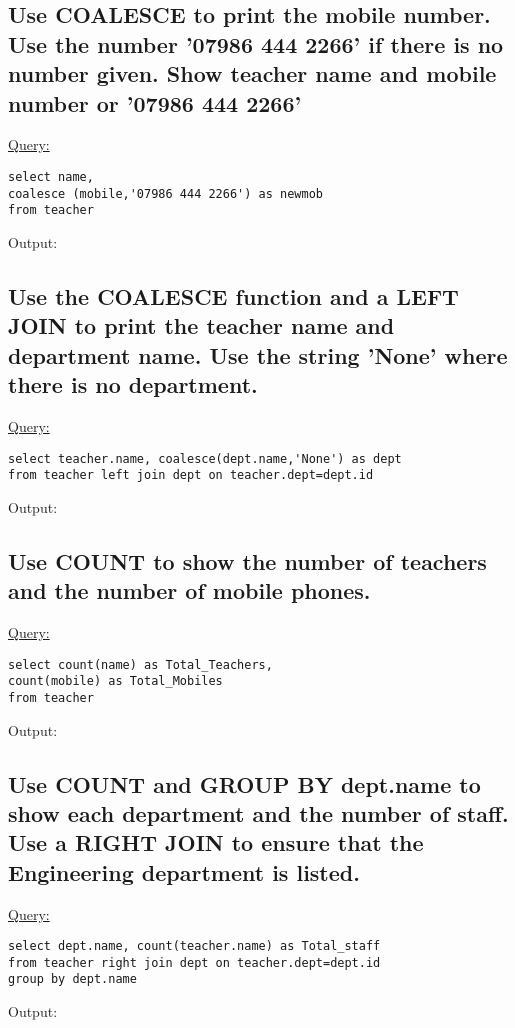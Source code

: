 \documentclass[a4paper,11pt]{article}
\begin{document}
\subsection{Use COALESCE to print the mobile number. Use the number '07986 444 2266' if there is no number given. Show teacher name and mobile number or '07986 444 2266'}
\underline{Query:}
\begin{lstlisting}[showstringspaces=false]
select name,
coalesce (mobile,'07986 444 2266') as newmob
from teacher
\end{lstlisting}
Output:
\begin{figure}[H]
\centering
{}
\end{figure}
\bigskip

\subsection{Use the COALESCE function and a LEFT JOIN to print the teacher name and department name. Use the string 'None' where there is no department.}
\underline{Query:}
\begin{lstlisting}[showstringspaces=false]
select teacher.name, coalesce(dept.name,'None') as dept
from teacher left join dept on teacher.dept=dept.id
\end{lstlisting}
Output:
\begin{figure}[H]
\centering
{}
\end{figure}
\medskip
\subsection{Use COUNT to show the number of teachers and the number of mobile phones.}
\underline{Query:}
\begin{lstlisting}[showstringspaces=false]
select count(name) as Total_Teachers,
count(mobile) as Total_Mobiles 
from teacher
\end{lstlisting}
Output:
\begin{figure}[H]
\centering
{}
\end{figure}
\medskip
\subsection{Use COUNT and GROUP BY dept.name to show each department and the number of staff. Use a RIGHT JOIN to ensure that the Engineering department is listed.}
\underline{Query:}
\begin{lstlisting}[showstringspaces=false]
select dept.name, count(teacher.name) as Total_staff
from teacher right join dept on teacher.dept=dept.id
group by dept.name
\end{lstlisting}
Output:
\begin{figure}[H]
\centering
{}
\end{figure}
\bigskip
\end{document}
